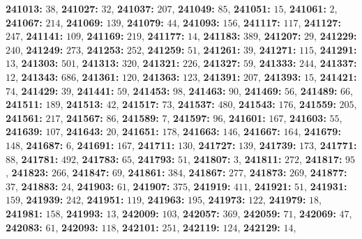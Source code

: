 \textsf{\bfseries 241013:} $38$, \textsf{\bfseries 241027:} $32$, \textsf{\bfseries 241037:} $207$, \textsf{\bfseries 241049:} $85$, \textsf{\bfseries 241051:} $15$, \textsf{\bfseries 241061:} $2$, \textsf{\bfseries 241067:} $214$, \textsf{\bfseries 241069:} $139$, \textsf{\bfseries 241079:} $44$, \textsf{\bfseries 241093:} $156$, \textsf{\bfseries 241117:} $117$, \textsf{\bfseries 241127:} $247$, \textsf{\bfseries 241141:} $109$, \textsf{\bfseries 241169:} $219$, \textsf{\bfseries 241177:} $14$, \textsf{\bfseries 241183:} $389$, \textsf{\bfseries 241207:} $29$, \textsf{\bfseries 241229:} $240$, \textsf{\bfseries 241249:} $273$, \textsf{\bfseries 241253:} $252$, \textsf{\bfseries 241259:} $51$, \textsf{\bfseries 241261:} $39$, \textsf{\bfseries 241271:} $115$, \textsf{\bfseries 241291:} $13$, \textsf{\bfseries 241303:} $501$, \textsf{\bfseries 241313:} $320$, \textsf{\bfseries 241321:} $226$, \textsf{\bfseries 241327:} $59$, \textsf{\bfseries 241333:} $244$, \textsf{\bfseries 241337:} $12$, \textsf{\bfseries 241343:} $686$, \textsf{\bfseries 241361:} $120$, \textsf{\bfseries 241363:} $123$, \textsf{\bfseries 241391:} $207$, \textsf{\bfseries 241393:} $15$, \textsf{\bfseries 241421:} $74$, \textsf{\bfseries 241429:} $39$, \textsf{\bfseries 241441:} $59$, \textsf{\bfseries 241453:} $98$, \textsf{\bfseries 241463:} $90$, \textsf{\bfseries 241469:} $56$, \textsf{\bfseries 241489:} $66$, \textsf{\bfseries 241511:} $189$, \textsf{\bfseries 241513:} $42$, \textsf{\bfseries 241517:} $73$, \textsf{\bfseries 241537:} $480$, \textsf{\bfseries 241543:} $176$, \textsf{\bfseries 241559:} $205$, \textsf{\bfseries 241561:} $217$, \textsf{\bfseries 241567:} $86$, \textsf{\bfseries 241589:} $7$, \textsf{\bfseries 241597:} $96$, \textsf{\bfseries 241601:} $167$, \textsf{\bfseries 241603:} $55$, \textsf{\bfseries 241639:} $107$, \textsf{\bfseries 241643:} $20$, \textsf{\bfseries 241651:} $178$, \textsf{\bfseries 241663:} $146$, \textsf{\bfseries 241667:} $164$, \textsf{\bfseries 241679:} $148$, \textsf{\bfseries 241687:} $6$, \textsf{\bfseries 241691:} $167$, \textsf{\bfseries 241711:} $130$, \textsf{\bfseries 241727:} $139$, \textsf{\bfseries 241739:} $173$, \textsf{\bfseries 241771:} $88$, \textsf{\bfseries 241781:} $492$, \textsf{\bfseries 241783:} $65$, \textsf{\bfseries 241793:} $51$, \textsf{\bfseries 241807:} $3$, \textsf{\bfseries 241811:} $272$, \textsf{\bfseries 241817:} $95$, \textsf{\bfseries 241823:} $266$, \textsf{\bfseries 241847:} $69$, \textsf{\bfseries 241861:} $384$, \textsf{\bfseries 241867:} $277$, \textsf{\bfseries 241873:} $269$, \textsf{\bfseries 241877:} $37$, \textsf{\bfseries 241883:} $24$, \textsf{\bfseries 241903:} $61$, \textsf{\bfseries 241907:} $375$, \textsf{\bfseries 241919:} $411$, \textsf{\bfseries 241921:} $51$, \textsf{\bfseries 241931:} $159$, \textsf{\bfseries 241939:} $242$, \textsf{\bfseries 241951:} $119$, \textsf{\bfseries 241963:} $195$, \textsf{\bfseries 241973:} $122$, \textsf{\bfseries 241979:} $18$, \textsf{\bfseries 241981:} $158$, \textsf{\bfseries 241993:} $13$, \textsf{\bfseries 242009:} $103$, \textsf{\bfseries 242057:} $369$, \textsf{\bfseries 242059:} $71$, \textsf{\bfseries 242069:} $47$, \textsf{\bfseries 242083:} $61$, \textsf{\bfseries 242093:} $118$, \textsf{\bfseries 242101:} $251$, \textsf{\bfseries 242119:} $124$, \textsf{\bfseries 242129:} $14$, 
